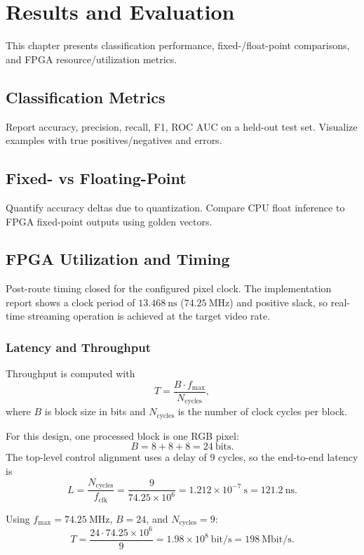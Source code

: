 \chapter{Results and Evaluation}\label{chap:results}
This chapter presents classification performance, fixed-/float-point comparisons, and FPGA resource/utilization metrics.

\section{Classification Metrics}
Report accuracy, precision, recall, F1, ROC AUC on a held-out test set. Visualize examples with true positives/negatives and errors.

\section{Fixed- vs Floating-Point}
Quantify accuracy deltas due to quantization. Compare CPU float inference to FPGA fixed-point outputs using golden vectors.

\section{FPGA Utilization and Timing}
Post-route timing closed for the configured pixel clock. The implementation report shows a clock period of \(13.468\ \text{ns}\) (\(74.25\ \text{MHz}\)) and positive slack, so real-time streaming operation is achieved at the target video rate.

\subsection{Latency and Throughput}
Throughput is computed with
\begin{equation}
T = \frac{B \cdot f_{\max}}{N_{\text{cycles}}},
\end{equation}
where \(B\) is block size in bits and \(N_{\text{cycles}}\) is the number of clock cycles per block.

For this design, one processed block is one RGB pixel:
\[
B = 8 + 8 + 8 = 24\ \text{bits}.
\]
The top-level control alignment uses a delay of 9 cycles, so the end-to-end latency is
\begin{equation}
L = \frac{N_{\text{cycles}}}{f_{\text{clk}}}
  = \frac{9}{74.25 \times 10^{6}}
  = 1.212 \times 10^{-7}\ \text{s}
  = 121.2\ \text{ns}.
\end{equation}

Using \(f_{\max} = 74.25\ \text{MHz}\), \(B=24\), and \(N_{\text{cycles}}=9\):
\begin{equation}
T = \frac{24 \cdot 74.25 \times 10^{6}}{9}
  = 1.98 \times 10^{8}\ \text{bit/s}
  = 198\ \text{Mbit/s}.
\end{equation}

